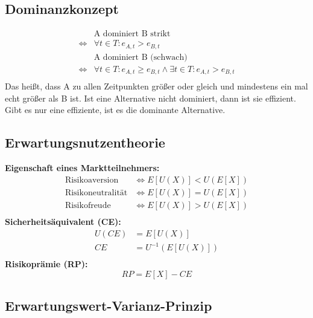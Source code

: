 \documentclass[leqno]{scrartcl}
\begin{document}
\begin{multicols}{4}
\subsection{Dominanzkonzept}
\begin{align*}
&\text{A dominiert B strikt}\\
\Leftrightarrow  &\forall t \in T : e_{A,t} > e_{B,t}\\
&\text{A dominiert B (schwach)}\\
\Leftrightarrow  &\forall t \in T : e_{A,t} \geq e_{B,t} \wedge \exists t \in T : e_{A,t} > e_{B,t}\\
\end{align*}
Das heißt, dass A zu allen Zeitpunkten größer oder gleich und mindestens ein mal 
echt größer als B ist. Ist eine Alternative nicht dominiert, dann ist sie 
effizient. Gibt es nur eine effiziente, ist es die dominante Alternative.

\subsection{Erwartungsnutzentheorie}

\textbf{Eigenschaft eines Marktteilnehmers:}
  \begin{equation*}
    \begin{split}
      \text{Risikoaversion}    &\Leftrightarrow E[U(X)] < U(E[X]) \\
      \text{Risikoneutralität} &\Leftrightarrow E[U(X)] = U(E[X]) \\
      \text{Risikofreude}      &\Leftrightarrow E[U(X)] > U(E[X]) \\
    \end{split}
  \end{equation*}
\textbf{Sicherheitsäquivalent (CE):}
  \begin{equation*}
    \begin{split}
      U(CE) &= E[U(X)]\\
        CE &= U^{-1}(E[U(X)])\\
    \end{split}
  \end{equation*}
\textbf{Risikoprämie (RP):}
  \begin{equation*}
    RP = E[X] - CE
  \end{equation*}

\subsection{Erwartungswert-Varianz-Prinzip}


\end{multicols}
\end{document}
